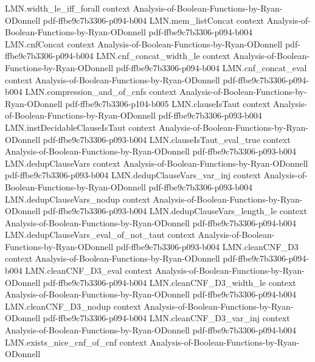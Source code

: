 \begin{lemma}
  {LMN.width_le_iff_forall}
  {context}
  {Analysis-of-Boolean-Functions-by-Ryan-ODonnell}
  {pdf-ffbe9c7b3306-p094-b004}
\proofstep
  {LMN.mem_listConcat}
  {context}
  {Analysis-of-Boolean-Functions-by-Ryan-ODonnell}
  {pdf-ffbe9c7b3306-p094-b004}
\proofstep
  {LMN.cnfConcat}
  {context}
  {Analysis-of-Boolean-Functions-by-Ryan-ODonnell}
  {pdf-ffbe9c7b3306-p094-b004}
\proofstep
  {LMN.cnf_concat_width_le}
  {context}
  {Analysis-of-Boolean-Functions-by-Ryan-ODonnell}
  {pdf-ffbe9c7b3306-p094-b004}
\proofstep
  {LMN.cnf_concat_eval}
  {context}
  {Analysis-of-Boolean-Functions-by-Ryan-ODonnell}
  {pdf-ffbe9c7b3306-p094-b004}
\proofstep
  {LMN.compression_and_of_cnfs}
  {context}
  {Analysis-of-Boolean-Functions-by-Ryan-ODonnell}
  {pdf-ffbe9c7b3306-p104-b005}
\proofstep
  {LMN.clauseIsTaut}
  {context}
  {Analysis-of-Boolean-Functions-by-Ryan-ODonnell}
  {pdf-ffbe9c7b3306-p093-b004}
\proofstep
  {LMN.instDecidableClauseIsTaut}
  {context}
  {Analysis-of-Boolean-Functions-by-Ryan-ODonnell}
  {pdf-ffbe9c7b3306-p093-b004}
\proofstep
  {LMN.clauseIsTaut_eval_true}
  {context}
  {Analysis-of-Boolean-Functions-by-Ryan-ODonnell}
  {pdf-ffbe9c7b3306-p093-b004}
\proofstep
  {LMN.dedupClauseVars}
  {context}
  {Analysis-of-Boolean-Functions-by-Ryan-ODonnell}
  {pdf-ffbe9c7b3306-p093-b004}
\proofstep
  {LMN.dedupClauseVars_var_inj}
  {context}
  {Analysis-of-Boolean-Functions-by-Ryan-ODonnell}
  {pdf-ffbe9c7b3306-p093-b004}
\proofstep
  {LMN.dedupClauseVars_nodup}
  {context}
  {Analysis-of-Boolean-Functions-by-Ryan-ODonnell}
  {pdf-ffbe9c7b3306-p093-b004}
\proofstep
  {LMN.dedupClauseVars_length_le}
  {context}
  {Analysis-of-Boolean-Functions-by-Ryan-ODonnell}
  {pdf-ffbe9c7b3306-p094-b004}
\proofstep
  {LMN.dedupClauseVars_eval_of_not_taut}
  {context}
  {Analysis-of-Boolean-Functions-by-Ryan-ODonnell}
  {pdf-ffbe9c7b3306-p093-b004}
\proofstep
  {LMN.cleanCNF_D3}
  {context}
  {Analysis-of-Boolean-Functions-by-Ryan-ODonnell}
  {pdf-ffbe9c7b3306-p094-b004}
\proofstep
  {LMN.cleanCNF_D3_eval}
  {context}
  {Analysis-of-Boolean-Functions-by-Ryan-ODonnell}
  {pdf-ffbe9c7b3306-p094-b004}
\proofstep
  {LMN.cleanCNF_D3_width_le}
  {context}
  {Analysis-of-Boolean-Functions-by-Ryan-ODonnell}
  {pdf-ffbe9c7b3306-p094-b004}
\proofstep
  {LMN.cleanCNF_D3_nodup}
  {context}
  {Analysis-of-Boolean-Functions-by-Ryan-ODonnell}
  {pdf-ffbe9c7b3306-p094-b004}
\proofstep
  {LMN.cleanCNF_D3_var_inj}
  {context}
  {Analysis-of-Boolean-Functions-by-Ryan-ODonnell}
  {pdf-ffbe9c7b3306-p094-b004}
\proofstep
  {LMN.exists_nice_cnf_of_cnf}
  {context}
  {Analysis-of-Boolean-Functions-by-Ryan-ODonnell}

\end{lemma}
